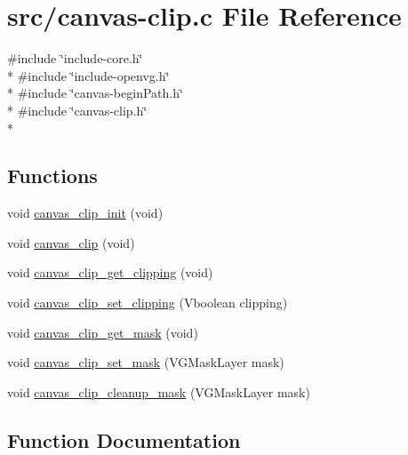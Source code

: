 \hypertarget{canvas-clip_8c}{}\section{src/canvas-\/clip.c File Reference}
\label{canvas-clip_8c}
{\ttfamily \#include \char`\"{}include-\/core.\+h\char`\"{}}\\*
{\ttfamily \#include \char`\"{}include-\/openvg.\+h\char`\"{}}\\*
{\ttfamily \#include \char`\"{}canvas-\/begin\+Path.\+h\char`\"{}}\\*
{\ttfamily \#include \char`\"{}canvas-\/clip.\+h\char`\"{}}\\*
\subsection*{Functions}
\begin{DoxyCompactItemize}
\item 
void \hyperlink{canvas-clip_8c_a2d531b09936a3622973c6902f251a8b7}{canvas\+\_\+clip\+\_\+init} (void)
\item 
void \hyperlink{canvas-clip_8c_ade0def031a2b4c1dcb342cb19c1ed695}{canvas\+\_\+clip} (void)
\item 
void \hyperlink{canvas-clip_8c_a3229367be84c7c738ed9865f1f69f30d}{canvas\+\_\+clip\+\_\+get\+\_\+clipping} (void)
\item 
void \hyperlink{canvas-clip_8c_ac84b32c692c901fade9dc96c2bf0efd6}{canvas\+\_\+clip\+\_\+set\+\_\+clipping} (Vboolean clipping)
\item 
void \hyperlink{canvas-clip_8c_a53daf46605efccfba6c61f98f97bb1a3}{canvas\+\_\+clip\+\_\+get\+\_\+mask} (void)
\item 
void \hyperlink{canvas-clip_8c_af889b304af28cd66095499ee7a2a2635}{canvas\+\_\+clip\+\_\+set\+\_\+mask} (V\+G\+Mask\+Layer mask)
\item 
void \hyperlink{canvas-clip_8c_a39e21e3c386f34eb80c2ea8dd437af23}{canvas\+\_\+clip\+\_\+cleanup\+\_\+mask} (V\+G\+Mask\+Layer mask)
\end{DoxyCompactItemize}


\subsection{Function Documentation}
\hypertarget{canvas-clip_8c_ade0def031a2b4c1dcb342cb19c1ed695}{}
